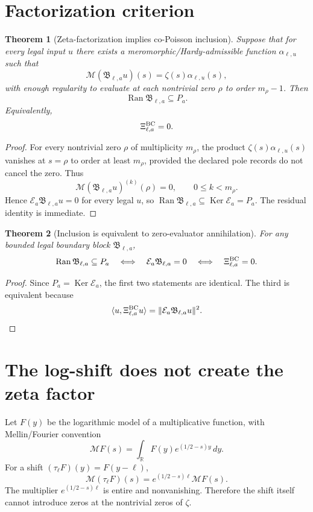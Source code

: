 \documentclass[11pt]{article}
\newtheorem{theorem}{Theorem}
\newcommand{\E}{\mathcal E}
\newcommand{\M}{\mathcal M}
\newcommand{\Ran}{\operatorname{Ran}}
\newcommand{\Ker}{\operatorname{Ker}}
\begin{document}
\section{Factorization criterion}
\begin{theorem}[Zeta-factorization implies co-Poisson inclusion]
Suppose that for every legal input \(u\) there exists a meromorphic/Hardy-admissible function \(\alpha_{\ell,u}\) such that
\[
  \M(\mathfrak B_{\ell,a}u)(s)=\zeta(s)\alpha_{\ell,u}(s),
\]
with enough regularity to evaluate at each nontrivial zero \(\rho\) to order \(m_\rho-1\).  Then
\[
  \Ran\mathfrak B_{\ell,a}\subseteq P_a.
\]
Equivalently,
\[
  \Xi^{\rm BC}_{\ell,a}=0.
\]
\end{theorem}

\begin{proof}
For every nontrivial zero \(\rho\) of multiplicity \(m_\rho\), the product \(\zeta(s)\alpha_{\ell,u}(s)\) vanishes at \(s=\rho\) to order at least \(m_\rho\), provided the declared pole records do not cancel the zero.  Thus
\[
  \M(\mathfrak B_{\ell,a}u)^{(k)}(\rho)=0,
  \qquad 0\le k<m_\rho.
\]
Hence \(\E_a\mathfrak B_{\ell,a}u=0\) for every legal \(u\), so \(\Ran\mathfrak B_{\ell,a}\subseteq\Ker\E_a=P_a\).  The residual identity is immediate.
\end{proof}

\begin{theorem}[Inclusion is equivalent to zero-evaluator annihilation]
For any bounded legal boundary block \(\mathfrak B_{\ell,a}\),
\[
  \Ran\mathfrak B_{\ell,a}\subseteq P_a
  \quad\Longleftrightarrow\quad
  \E_a\mathfrak B_{\ell,a}=0
  \quad\Longleftrightarrow\quad
  \Xi^{\rm BC}_{\ell,a}=0.
\]
\end{theorem}

\begin{proof}
Since \(P_a=\Ker\E_a\), the first two statements are identical.  The third is equivalent because
\[
  \langle u,\Xi^{\rm BC}_{\ell,a}u\rangle=\|\E_a\mathfrak B_{\ell,a}u\|^2.
\]
\end{proof}

\section{The log-shift does not create the zeta factor}
Let \(F(y)\) be the logarithmic model of a multiplicative function, with Mellin/Fourier convention
\[
  \M F(s)=\int_\mathbb R F(y)e^{(1/2-s)y}\,dy.
\]
For a shift \((\tau_\ell F)(y)=F(y-\ell)\),
\[
  \M(\tau_\ell F)(s)=e^{(1/2-s)\ell}\M F(s).
\]
The multiplier \(e^{(1/2-s)\ell}\) is entire and nonvanishing.  Therefore the shift itself cannot introduce zeros at the nontrivial zeros of \(\zeta\).
\end{document}
